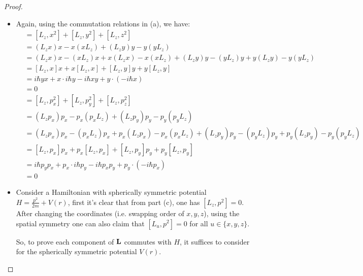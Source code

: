 \documentclass{article}
\begin{document}
\begin{proof}
\begin{itemize}
        \hfil

        \item[(c)] Again, using the commutation relations in (a), we have:
        \begin{align}
            [L_z,r^2] &= [L_z,x^2]+[L_z,y^2]+[L_z,z^2]\\
            &= (L_zx)x - x(xL_z)+(L_zy)y-y(yL_z)\\
            &= (L_zx)x - (xL_z)x + x(L_zx)-x(xL_z)+(L_zy)y-(yL_z)y+y(L_zy)-y(yL_z)\\
            &= [L_z,x]x + x[L_z,x]+[L_z,y]y+y[L_z,y]\\
            &= i\hbar yx + x\cdot i\hbar y -i\hbar x y + y \cdot (-i\hbar x)\\
            &= 0
        \end{align}
        \begin{align}
            [L_z,p^2] &= [L_z,p_x^2]+[L_z,p_y^2]+[L_z,p_z^2]\\
            &= (L_zp_x)p_x-p_x(p_xL_z)+(L_zp_y)p_y-p_y(p_yL_z)\\
            &= (L_zp_x)p_x-(p_x L_z)p_x+p_x(L_zp_x) - p_x(p_xL_z)+(L_zp_y)p_y-(p_yL_z)p_y + p_y(L_zp_y)-p_y(p_yL_z)\\
            &= [L_z,p_x]p_x + p_x[L_z,p_x]+[L_z,p_y]p_y+p_y[L_z,p_y]\\
            &= i\hbar p_yp_x + p_x\cdot i\hbar p_y -i\hbar p_x p_y + p_y \cdot (-i\hbar p_x)\\
            &= 0
        \end{align}

        \hfil

        \item[(d)] Consider a Hamiltonian with spherically symmetric potential $H = \frac{p^2}{2m}+V(r)$, first it's clear that from part (c), one has $[L_z,p^2]=0$. After changing the coordinates (i.e. swapping order of $x,y,z$), using the spatial symmetry one can also claim that $[L_u,p^2]=0$ for all $u\in\{x,y,z\}$.
        
        So, to prove each component of $\mathbf{L}$ commutes with $H$, it suffices to consider for the spherically symmetric potential $V(r)$.


\end{itemize}
\end{proof}
\end{document}
